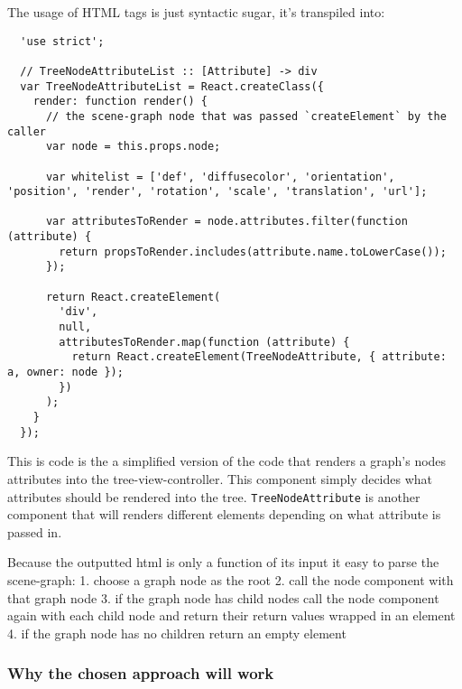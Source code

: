 The usage of HTML tags is just syntactic sugar, it's transpiled into:

\begin{verbatim}
  'use strict';

  // TreeNodeAttributeList :: [Attribute] -> div
  var TreeNodeAttributeList = React.createClass({
    render: function render() {
      // the scene-graph node that was passed `createElement` by the caller
      var node = this.props.node;

      var whitelist = ['def', 'diffusecolor', 'orientation', 'position', 'render', 'rotation', 'scale', 'translation', 'url'];

      var attributesToRender = node.attributes.filter(function (attribute) {
        return propsToRender.includes(attribute.name.toLowerCase());
      });

      return React.createElement(
        'div',
        null,
        attributesToRender.map(function (attribute) {
          return React.createElement(TreeNodeAttribute, { attribute: a, owner: node });
        })
      );
    }
  });
\end{verbatim}

This is code is the a simplified version of the code that renders a
graph's nodes attributes into the tree-view-controller. This component
simply decides what attributes should be rendered into the tree.
\texttt{TreeNodeAttribute} is another component that will renders
different elements depending on what attribute is passed in.

Because the outputted html is only a function of its input it easy to
parse the scene-graph: 1. choose a graph node as the root 2. call the
node component with that graph node 3. if the graph node has child nodes
call the node component again with each child node and return their
return values wrapped in an element 4. if the graph node has no children
return an empty element

\subsubsection{Why the chosen approach will
work}\label{why-the-chosen-approach-will-work}


